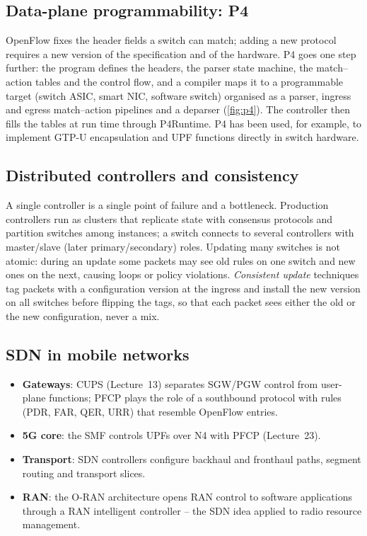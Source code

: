 \documentclass[11pt,a4paper]{article}
\begin{document}
\subsection{Data-plane programmability: P4}
OpenFlow fixes the header fields a switch can match; adding a new protocol requires a new version of the
specification and of the hardware. P4 \cite{bosshart2014p4} goes one step further: the program defines the
headers, the parser state machine, the match--action tables and the control flow, and a compiler maps it to a
programmable target (switch ASIC, smart NIC, software switch) organised as a parser, ingress and egress
match--action pipelines and a deparser (\cref{fig:p4}). The controller then fills the tables at run time
through P4Runtime. P4 has been used, for example, to implement GTP-U encapsulation and UPF functions directly
in switch hardware.

\begin{acnfigure}
  \caption{Protocol-independent switch architecture programmed with P4.}
  \label{fig:p4}
\end{acnfigure}

\subsection{Distributed controllers and consistency}
A single controller is a single point of failure and a bottleneck. Production controllers run as clusters
that replicate state with consensus protocols and partition switches among instances; a switch connects to
several controllers with master/slave (later primary/secondary) roles. Updating many switches is not atomic:
during an update some packets may see old rules on one switch and new ones on the next, causing loops or
policy violations. \emph{Consistent update} techniques tag packets with a configuration version at the ingress
and install the new version on all switches before flipping the tags, so that each packet sees either the old
or the new configuration, never a mix.

\subsection{SDN in mobile networks}
\begin{itemize}
  \item \textbf{Gateways}: CUPS (Lecture~13) separates SGW/PGW control from user-plane functions; PFCP plays the
        role of a southbound protocol with rules (PDR, FAR, QER, URR) that resemble OpenFlow entries.
  \item \textbf{5G core}: the SMF controls UPFs over N4 with PFCP (Lecture~23).
  \item \textbf{Transport}: SDN controllers configure backhaul and fronthaul paths, segment routing and transport
        slices.
  \item \textbf{RAN}: the O-RAN architecture opens RAN control to software applications through a RAN intelligent
        controller -- the SDN idea applied to radio resource management.
\end{itemize}
\end{document}
